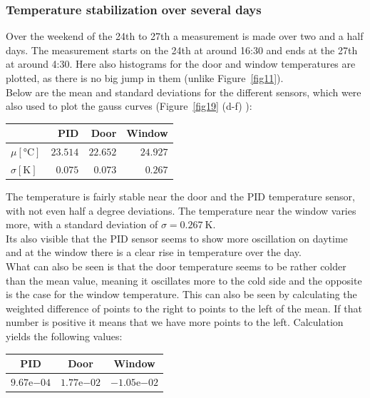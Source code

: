 \documentclass[12pt]{scrartcl}
\begin{document}
      \subsubsection{Temperature stabilization over several days}
      Over the weekend of the 24th to 27th a measurement is made over two
      and a half days. The measurement starts on the 24th at around 16:30 and
      ends at the 27th at around 4:30. Here also histograms for the
      door and window temperatures are plotted, as there is no big jump in them (unlike
      Figure~\ref{fig11}).\\
      Below are the mean and standard deviations for the different sensors, which
      were also used to plot the gauss curves (Figure~\ref{fig19} (d-f) ):
      \\
      \begin{table}[H]
        \begin{tabular}{l | r | r | r}
          & PID & Door & Window \\
          \hline
          $\mu[\text{°C}]$ & $23.514$ & $22.652$ & $24.927$ \\
          $\sigma[\text{K}]$ & $0.075$ & $0.073$ & $0.267$
        \end{tabular}
      \end{table}
      The temperature is fairly stable near the door and the PID
      temperature sensor, with
      not even half a degree deviations. The temperature near the window varies
      more, with a standard deviation of $\sigma = 0.267~\text{K}$.\\
      Its also visible that the PID sensor seems to show more oscillation on
      daytime and at the window there is a clear rise in temperature over the day.
      \\What can also be seen is that the door temperature seems to be rather
      colder than the mean value, meaning it oscillates more to the cold side
      and the opposite is the case for the window temperature. This can also be
      seen by calculating the weighted difference of points to the right to
      points to the left of the mean. If that number is positive it means that
      we have more points to the left.
      Calculation yields the following values: \vspace{-5pt}
      \begin{table}[H]
        \begin{tabular}{c | c | c}
          PID & Door & Window \\
          \hline
          $9.67\mathrm{e}{-04}$ & $1.77\mathrm{e}{-02}$ & $-1.05\mathrm{e}{-02}$
        \end{tabular}
      \end{table}
\end{document}
